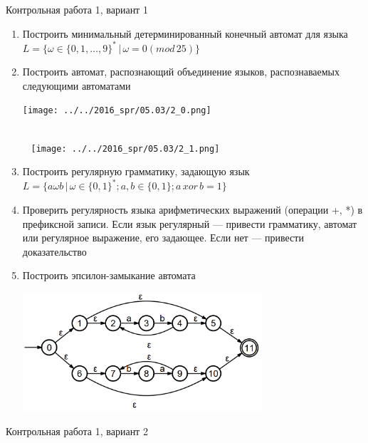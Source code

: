 \documentclass[12pt]{article}
\begin{document}

{\Large Контрольная работа 1, вариант 1}
\bigskip

\begin{enumerate}
  \item Построить минимальный детерминированный конечный автомат для языка \\ $L = \{ \omega \in \{ 0, 1, \dots, 9 \}^* \, | \, \omega = 0 (mod \, 25) \} $
  \item { 
         Построить автомат, распознающий объединение языков, распознаваемых следующими автоматами
         
         \texttt{[image: ../../2016\_spr/05.03/2\_0.png]}
         
~\\~
         \texttt{[image: ../../2016\_spr/05.03/2\_1.png]} 
        }
    \item Построить регулярную грамматику, задающую язык \\ $L = \{ a \omega b \, | \, \omega \in \{ 0, 1 \}^*; a, b \in \{ 0, 1 \}; a \, xor \, b = 1 \} $
    \item Проверить регулярность языка арифметических выражений (операции +, *) в префиксной записи. Если язык регулярный --- привести грамматику, автомат или регулярное выражение, его задающее. Если нет --- привести доказательство
    \item {Построить эпсилон-замыкание автомата
           
           \includegraphics[width=0.7\textwidth]{test1a_ec.PNG}
    }
\end{enumerate}

\pagebreak


{\Large Контрольная работа 1, вариант 2}
\bigskip
\end{document}
